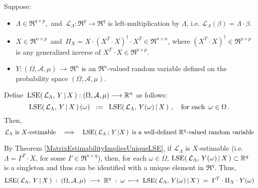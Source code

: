 \begin{theorem}
\label{LSEofEstimableFunctionsAreRandomVariables}
\mbox{}\vskip 0.1cm\noindent
Suppose:
\begin{itemize}
\item
	$\Lambda \in \Re^{q \times p}$,\,
	and
	\,$\mathcal{L}_{\Lambda} : \Re^{p} \longrightarrow \Re^{q}$ is left-multiplication by $\Lambda$,
	i.e. $\mathcal{L}_{\Lambda}(\beta) = \Lambda \cdot \beta$.
\item
	$X \in \Re^{n \times p}$\, and \,$\Pi_{X} = X\cdot(X^{T}\cdot X)^{\dagger}\cdot X^{T} \in \Re^{n \times n}$,
	where $(X^{T}\cdot X)^{\dagger} \in \Re^{p \times p}$ is any generalized inverse of
	$X^{T}\cdot X \in \Re^{p \times p}$.
\item
	$Y : (\Omega,\mathcal{A},\mu) \,\longrightarrow\, \Re^{n}$ is an $\Re^{n}$-valued
	random variable defined on the probability space $(\Omega,\mathcal{A},\mu)$.
\end{itemize}
Define \,$\textnormal{LSE}\!\left(\,\mathcal{L}_{\Lambda},\,Y\,\vert\,X\,\right) : (\Omega,\mathcal{A},\mu) \longrightarrow \mathbb{R}^{n}$
as follows:
\begin{equation*}
\textnormal{LSE}\!\left(\,\mathcal{L}_{\Lambda},\,Y\,\vert\,X\,\right)(\omega)
\;\; := \;\; \textnormal{LSE}\!\left(\,\mathcal{L}_{\Lambda},\,Y(\omega)\,\vert\,X\,\right)\,,
\quad
\textnormal{for each \,$\omega \in \Omega$}\,.
\end{equation*}
Then,
\begin{equation*}
\textnormal{$\mathcal{L}_{\Lambda}$ is $X$-estimable}
\quad\Longrightarrow\quad
\textnormal{$\textnormal{LSE}\!\left(\,\mathcal{L}_{\Lambda} \,;\, Y\,\vert X\,\right)$\,
is a well-defined $\mathbb{R}^{q}$-valued random variable}
\end{equation*}
\end{theorem}
\proof
By Theorem \ref{MatrixEstimabilityImpliesUniqueLSE},
if $\mathcal{L}_{\Lambda}$ is $X$-estimable (i.e. $\Lambda = \Gamma^{T} \cdot X$,
for some $\Gamma \in \Re^{n \times q}$), then, for each $\omega \in \Omega$,
$\textnormal{LSE}\!\left(\,\mathcal{L}_{\Lambda},\,Y(\omega)\,\vert\,X\,\right) \subset \mathbb{R}^{q}$
is a singleton and thus can be identified with a unique element in $\Re^{q}$.
Thus,
\begin{equation*}
\textnormal{LSE}\!\left(\,\mathcal{L}_{\Lambda},\,Y\,\vert\,X\,\right)
\;:\; (\Omega,\mathcal{A},\mu) \; \longrightarrow \; \mathbb{R}^{q}
\;:\; \omega \; \longmapsto \; \textnormal{LSE}\!\left(\,\mathcal{L}_{\Lambda},\,Y(\omega)\,\vert\,X\,\right)
\;=\; \Gamma^{T} \cdot \Pi_{X} \cdot Y(\omega)
\end{equation*}
